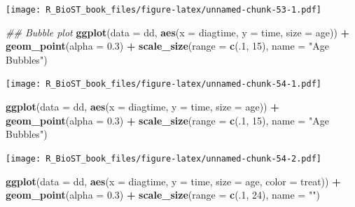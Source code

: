 \documentclass[
]{book}
\newenvironment{Shaded}{\begin{snugshade}}{\end{snugshade}}
\newcommand{\CommentTok}[1]{\textcolor[rgb]{0.56,0.35,0.01}{\textit{#1}}}
\newcommand{\DataTypeTok}[1]{\textcolor[rgb]{0.13,0.29,0.53}{#1}}
\newcommand{\DecValTok}[1]{\textcolor[rgb]{0.00,0.00,0.81}{#1}}
\newcommand{\FloatTok}[1]{\textcolor[rgb]{0.00,0.00,0.81}{#1}}
\newcommand{\KeywordTok}[1]{\textcolor[rgb]{0.13,0.29,0.53}{\textbf{#1}}}
\newcommand{\NormalTok}[1]{#1}
\newcommand{\OperatorTok}[1]{\textcolor[rgb]{0.81,0.36,0.00}{\textbf{#1}}}
\newcommand{\StringTok}[1]{\textcolor[rgb]{0.31,0.60,0.02}{#1}}
\begin{document}
\texttt{[image: R\_BioST\_book\_files/figure-latex/unnamed-chunk-53-1.pdf]}

\begin{Shaded}
\begin{Highlighting}[]
\CommentTok{\#\# Bubble plot}
\KeywordTok{ggplot}\NormalTok{(}\DataTypeTok{data =}\NormalTok{ dd, }\KeywordTok{aes}\NormalTok{(}\DataTypeTok{x =}\NormalTok{ diagtime, }\DataTypeTok{y =}\NormalTok{ time, }\DataTypeTok{size =}\NormalTok{ age)) }\OperatorTok{+}\StringTok{ }
\StringTok{  }\KeywordTok{geom\_point}\NormalTok{(}\DataTypeTok{alpha =} \FloatTok{0.3}\NormalTok{) }\OperatorTok{+}\StringTok{ }
\StringTok{  }\KeywordTok{scale\_size}\NormalTok{(}\DataTypeTok{range =} \KeywordTok{c}\NormalTok{(.}\DecValTok{1}\NormalTok{, }\DecValTok{15}\NormalTok{), }\DataTypeTok{name =} \StringTok{"Age Bubbles"}\NormalTok{)}
\end{Highlighting}
\end{Shaded}

\texttt{[image: R\_BioST\_book\_files/figure-latex/unnamed-chunk-54-1.pdf]}

\begin{Shaded}
\begin{Highlighting}[]
\KeywordTok{ggplot}\NormalTok{(}\DataTypeTok{data =}\NormalTok{ dd, }\KeywordTok{aes}\NormalTok{(}\DataTypeTok{x =}\NormalTok{ diagtime, }\DataTypeTok{y =}\NormalTok{ time, }\DataTypeTok{size =}\NormalTok{ age)) }\OperatorTok{+}\StringTok{ }
\StringTok{  }\KeywordTok{geom\_point}\NormalTok{(}\DataTypeTok{alpha =} \FloatTok{0.3}\NormalTok{) }\OperatorTok{+}\StringTok{ }
\StringTok{  }\KeywordTok{scale\_size}\NormalTok{(}\DataTypeTok{range =} \KeywordTok{c}\NormalTok{(.}\DecValTok{1}\NormalTok{, }\DecValTok{15}\NormalTok{), }\DataTypeTok{name =} \StringTok{"Age Bubbles"}\NormalTok{)}
\end{Highlighting}
\end{Shaded}

\texttt{[image: R\_BioST\_book\_files/figure-latex/unnamed-chunk-54-2.pdf]}

\begin{Shaded}
\begin{Highlighting}[]
\KeywordTok{ggplot}\NormalTok{(}\DataTypeTok{data =}\NormalTok{ dd, }\KeywordTok{aes}\NormalTok{(}\DataTypeTok{x =}\NormalTok{ diagtime, }\DataTypeTok{y =}\NormalTok{ time, }\DataTypeTok{size =}\NormalTok{ age, }\DataTypeTok{color =}\NormalTok{ treat)) }\OperatorTok{+}\StringTok{ }
\StringTok{  }\KeywordTok{geom\_point}\NormalTok{(}\DataTypeTok{alpha =} \FloatTok{0.3}\NormalTok{) }\OperatorTok{+}\StringTok{ }
\KeywordTok{scale\_size}\NormalTok{(}\DataTypeTok{range =} \KeywordTok{c}\NormalTok{(.}\DecValTok{1}\NormalTok{, }\DecValTok{24}\NormalTok{), }\DataTypeTok{name =} \StringTok{""}\NormalTok{)}
\end{Highlighting}
\end{Shaded}
\end{document}
